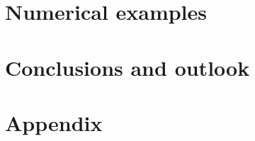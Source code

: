 \documentclass[10pt,a4paper]{article}
\newcommand{\ded}{\mathrm{d}}
\newcommand{\dep}{\mathrm{p}}
\begin{document}


\section{Numerical examples}\label{sec:examples}

\section{Conclusions and outlook}\label{sec:conlusions}

\section{Appendix}
\end{document}

